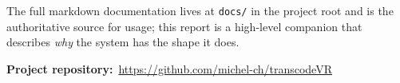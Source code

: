 \documentclass[11pt,a4paper]{article}
\begin{document}
The full markdown documentation lives at \texttt{docs/} in the project
root and is the authoritative source for usage; this report is a
high-level companion that describes \emph{why} the system has the
shape it does.

\vspace{1cm}
\noindent\textbf{Project repository:}\ \url{https://github.com/michel-ch/transcodeVR}
\end{document}
